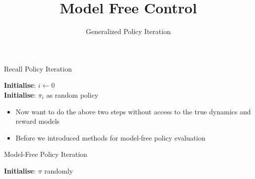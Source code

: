 \documentclass[aspectratio=169]{../latex_main/tntbeamer}  %
\title[RL: Model Free Control]{Model Free Control}
\subtitle{Generalized Policy Iteration}
\begin{document}
	
	\maketitle

\begin{frame}[c]{Recall Policy Iteration}
\begin{algorithm}[H]
  \caption{Policy Iteration}
  \DontPrintSemicolon
  \textbf{Initialise}: $i \leftarrow 0$\\
  \textbf{Initialise}: $\pi_i$ as random policy\\
\end{algorithm}
\begin{itemize}
	\item Now want to do the above two steps \alert{without} access to the true dynamics and reward models
	\item Before we introduced methods for model-free policy evaluation
\end{itemize}

\end{frame}
\begin{frame}[c]{Model-Free Policy Iteration}
	
	\begin{algorithm}[H]
    \caption{General Model Free  Policy Iteration}
    \DontPrintSemicolon
    \LinesNotNumbered
    \textbf{Initialise}: $\pi$ randomly
    
\end{algorithm}
	
\end{frame}
\end{document}
